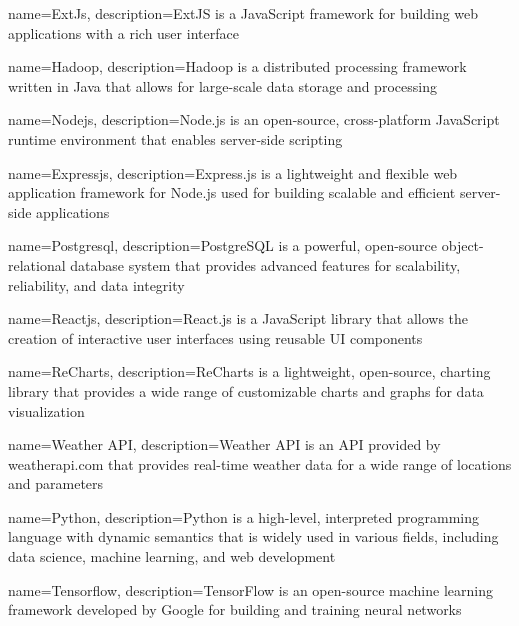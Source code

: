 \usepackage{glossaries}
\makenoidxglossaries

\renewcommand{\glstextformat}[1]{\textit{#1}}

{
    name=ExtJs,
    description={ExtJS is a JavaScript framework for building web applications with a rich user interface}
}

{
    name=Hadoop,
    description={Hadoop is a distributed processing framework written in Java that allows for large-scale data storage and processing}
}

{
    name=Nodejs,
    description={Node.js is an open-source, cross-platform JavaScript runtime environment that enables server-side scripting}
}

{
    name=Expressjs,
    description={Express.js is a lightweight and flexible web application framework for Node.js used for building scalable and efficient server-side applications~\parencite{expressjs}}
}

{
    name=Postgresql,
    description={PostgreSQL is a powerful, open-source object-relational database system that provides advanced features for scalability, reliability, and data integrity}
}

{
    name=Reactjs,
    description={React.js is a JavaScript library that allows the creation of interactive user interfaces using reusable UI components}
}

{
    name=ReCharts,
    description={ReCharts is a lightweight, open-source, charting library that provides a wide range of customizable charts and graphs for data visualization}
}

{
    name=Weather API,
    description={Weather API is an API provided by weatherapi.com that provides real-time weather data for a wide range of locations and parameters}
}

{
    name=Python,
    description={Python is a high-level, interpreted programming language with dynamic semantics that is widely used in various fields, including data science, machine learning, and web development}
}

{
    name=Tensorflow,
    description={TensorFlow is an open-source machine learning framework developed by Google for building and training neural networks}
}


